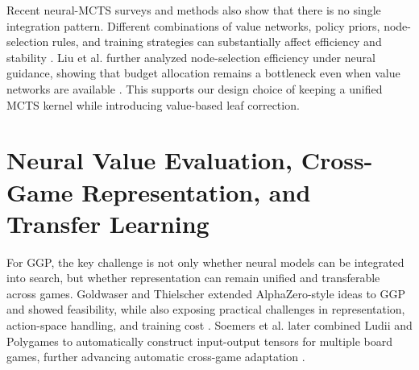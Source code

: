 
Recent neural-MCTS surveys and methods also show that there is no single integration pattern. Different combinations of value networks, policy priors, node-selection rules, and training strategies can substantially affect efficiency and stability \cite{kemmerling2023neural}. Liu et al. further analyzed node-selection efficiency under neural guidance, showing that budget allocation remains a bottleneck even when value networks are available \cite{liu2024efficient}. This supports our design choice of keeping a unified MCTS kernel while introducing value-based leaf correction.


\section{Neural Value Evaluation, Cross-Game Representation, and Transfer Learning}


For GGP, the key challenge is not only whether neural models can be integrated into search, but whether representation can remain unified and transferable across games. Goldwaser and Thielscher extended AlphaZero-style ideas to GGP and showed feasibility, while also exposing practical challenges in representation, action-space handling, and training cost \cite{goldwaser2020deep}. Soemers et al. later combined Ludii and Polygames to automatically construct input-output tensors for multiple board games, further advancing automatic cross-game adaptation \cite{soemers2021ludii}.

